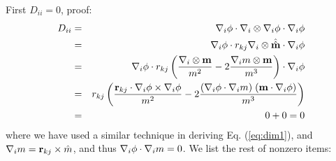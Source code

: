 \documentclass{article}
\begin{document}
First $D_{ii} = 0$, proof:
\begin{eqnarray*}
D_{ii} 
&=& \nabla_i \phi \cdot \nabla_i \otimes \nabla_i \phi \cdot \nabla_i \phi \\
&=& \nabla_i \phi \cdot r_{kj} \nabla_i \otimes \hat{\hat{\mathbf{m}}} \cdot \nabla_i \phi \\
&=& \nabla_i \phi \cdot r_{kj} 
    \left(
    \frac {\nabla_i \otimes \mathbf{m}} {m^2}
    - 2 \frac{\nabla_i m \otimes \mathbf{m}}{m^3} 
    \right)
  \cdot \nabla_i \phi \\
&=& r_{kj} \left(
    \frac {\mathbf{r}_{kj} \cdot \nabla_i \phi \times \nabla_i \phi} {m^2}
    - 2 \frac{(\nabla_i \phi \cdot \nabla_i m) \; (\mathbf{m} \cdot \nabla_i \phi)}{m^3} 
    \right) \\
&=& 0 + 0 = 0
\end{eqnarray*}
where we have used a similar technique in deriving Eq. (\ref{eq:dim1}),
and $\nabla_i m = \mathbf{r}_{kj} \times \hat m$, 
and thus $\nabla_i \phi \cdot \nabla_i m = 0$.
We list the rest of nonzero items:
\end{document}
